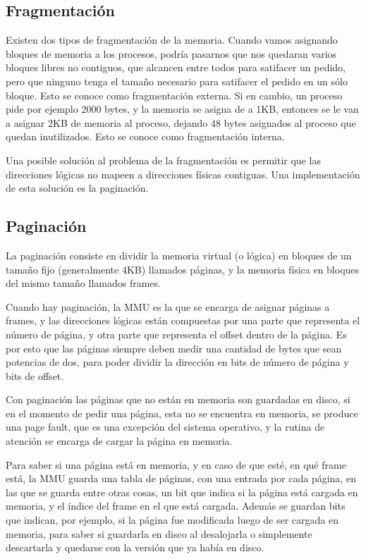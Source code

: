 \documentclass{article}
\begin{document}
\subsection{Fragmentaci\'on}

Existen dos tipos de fragmentaci\'on de la memoria. Cuando vamos asignando bloques de memoria a los procesos, podr\'ia pasarnos que nos quedaran varios bloques libres no contiguos, que alcancen entre todos para satifacer un pedido, pero que ninguno tenga el tama\~no necesario para satifacer el pedido en un s\'olo bloque. Esto se conoce como fragmentaci\'on externa. Si en cambio, un proceso pide por ejemplo 2000 bytes, y la memoria se asigna de a 1KB, entonces se le van a asignar 2KB de memoria al proceso, dejando 48 bytes asignados al proceso que quedan inutilizados. Esto se conoce como fragmentaci\'on interna.

Una posible soluci\'on al problema de la fragmentaci\'on es permitir que las direcciones l\'ogicas no mapeen a direcciones f\'isicas contiguas. Una implementaci\'on de esta soluci\'on es la paginaci\'on.

\subsection{Paginaci\'on}

La paginaci\'on consiste en dividir la memoria virtual (o l\'ogica) en bloques de un tama\~no fijo (generalmente 4KB) llamados p\'aginas, y la memoria f\'isica en bloques del mismo tama\~no llamados frames.

Cuando hay paginaci\'on, la MMU es la que se encarga de asignar p\'aginas a frames, y las direcciones l\'ogicas est\'an compuestas por una parte que representa el n\'umero de p\'agina, y otra parte que representa el offset dentro de la p\'agina. Es por esto que las p\'aginas siempre deben medir una cantidad de bytes que sean potencias de dos, para poder dividir la direcci\'on en bits de n\'umero de p\'agina y bits de offset.

Con paginaci\'on las p\'aginas que no est\'an en memoria son guardadas en disco, si en el momento de pedir una p\'agina, esta no se encuentra en memoria, se produce una page fault, que es una excepci\'on del sistema operativo, y la rutina de atenci\'on se encarga de cargar la p\'agina en memoria.

Para saber si una p\'agina est\'a en memoria, y en caso de que est\'e, en qu\'e frame est\'a, la MMU guarda una tabla de p\'aginas, con una entrada por cada p\'agina, en las que se guarda entre otras cosas, un bit que indica si la p\'agina est\'a cargada en memoria, y el \'indice del frame en el que est\'a cargada. Adem\'as se guardan bits que indican, por ejemplo, si la p\'agina fue modificada luego de ser cargada en memoria, para saber si guardarla en disco al desalojarla o simplemente descartarla y quedarse con la versi\'on que ya hab\'ia en disco.
\end{document}
